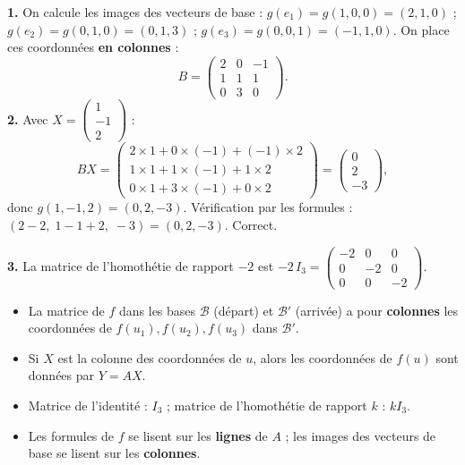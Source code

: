 \documentclass[11pt]{article}
\begin{document}
\begin{corrige}
\textbf{1.} On calcule les images des vecteurs de base : $g(e_1) = g(1,0,0) = (2, 1, 0)$ ; $g(e_2) = g(0,1,0) = (0, 1, 3)$ ; $g(e_3) = g(0,0,1) = (-1, 1, 0)$. On place ces coordonnées \textbf{en colonnes} :
\[ B = \begin{pmatrix} 2 & 0 & -1 \\ 1 & 1 & 1 \\ 0 & 3 & 0 \end{pmatrix}. \]
\textbf{2.} Avec $X = \begin{pmatrix} 1 \\ -1 \\ 2 \end{pmatrix}$ :
\[ BX = \begin{pmatrix} 2 \times 1 + 0 \times (-1) + (-1) \times 2 \\ 1 \times 1 + 1 \times (-1) + 1 \times 2 \\ 0 \times 1 + 3 \times (-1) + 0 \times 2 \end{pmatrix} = \begin{pmatrix} 0 \\ 2 \\ -3 \end{pmatrix}, \]
donc $g(1, -1, 2) = (0, 2, -3)$. Vérification par les formules : $(2 - 2,\; 1 - 1 + 2,\; -3) = (0, 2, -3)$. Correct.

\textbf{3.} La matrice de l'homothétie de rapport $-2$ est $-2\,I_3 = \begin{pmatrix} -2 & 0 & 0 \\ 0 & -2 & 0 \\ 0 & 0 & -2 \end{pmatrix}$.
\end{corrige}

\begin{aretenir}
\begin{itemize}
\item La matrice de $f$ dans les bases $\mathcal{B}$ (départ) et $\mathcal{B}'$ (arrivée) a pour \textbf{colonnes} les coordonnées de $f(u_1), f(u_2), f(u_3)$ dans $\mathcal{B}'$.
\item Si $X$ est la colonne des coordonnées de $u$, alors les coordonnées de $f(u)$ sont données par $Y = AX$.
\item Matrice de l'identité : $I_3$ ; matrice de l'homothétie de rapport $k$ : $kI_3$.
\item Les formules de $f$ se lisent sur les \textbf{lignes} de $A$ ; les images des vecteurs de base se lisent sur les \textbf{colonnes}.
\end{itemize}
\end{aretenir}
\end{document}
